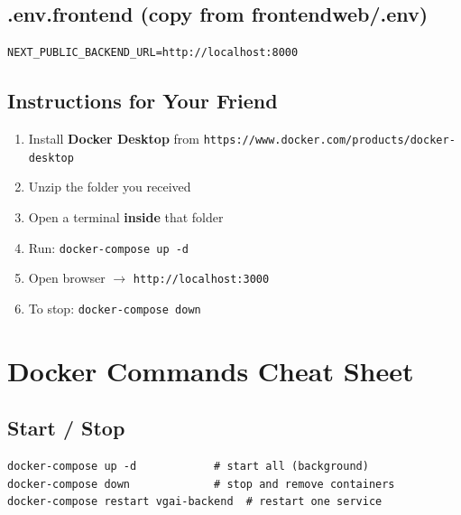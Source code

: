 \documentclass[12pt]{article}
\newenvironment{codeblock}{%
  \needspace{6\baselineskip}%
  \noindent\minipage{\linewidth}%
}{%
  \endminipage%
}
\begin{document}
\subsection{.env.frontend (copy from frontendweb/.env)}
\begin{codeblock}
\begin{lstlisting}[style=codestyle]
NEXT_PUBLIC_BACKEND_URL=http://localhost:8000
\end{lstlisting}
\end{codeblock}

\subsection{Instructions for Your Friend}
\begin{stepbox}
\begin{enumerate}[leftmargin=*, label=\textbf{\arabic*.}, itemsep=3pt]
  \item Install \textbf{Docker Desktop} from \texttt{https://www.docker.com/products/docker-desktop}
  \item Unzip the folder you received
  \item Open a terminal \textbf{inside} that folder
  \item Run: \quad\texttt{\color{sectioncolor}docker-compose up -d}
  \item Open browser $\rightarrow$ \texttt{http://localhost:3000} \checkmark
  \item To stop: \quad\texttt{\color{sectioncolor}docker-compose down}
\end{enumerate}
\end{stepbox}

\section{Docker Commands Cheat Sheet}

\subsection{Start / Stop}
\begin{codeblock}
\begin{lstlisting}[style=commandstyle]
docker-compose up -d            # start all (background)
docker-compose down             # stop and remove containers
docker-compose restart vgai-backend  # restart one service
\end{lstlisting}
\end{codeblock}
\end{document}
